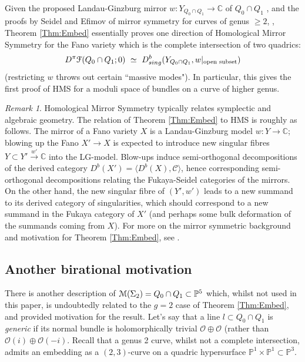 \documentclass[reqno,10pt]{amsart}
\numberwithin{equation}{section}
\newcommand{\bC}{{\mathbb C}}
\newcommand{\bP}{{\mathbb P}}
\newcommand{\scrF}{\EuScript{F}}
\newcommand{\scrM}{\EuScript{M}}
\theoremstyle{remark}
\newtheorem{Remark}[thm]{Remark}
\begin{document}
Given the proposed  Landau-Ginzburg mirror $w:Y_{Q_0 \cap Q_1} \rightarrow \bC$ of  $Q_0 \cap Q_1$ \cite{Katzarkov, Przyj}, and the proofs by Seidel and Efimov of mirror symmetry for curves of genus $\geq 2$,  \cite{Seidel:HMSgenus2, Efimov}, Theorem \ref{Thm:Embed}  essentially proves one direction of Homological Mirror Symmetry for the  Fano variety which is the complete intersection of two quadrics:
\[ D^{\pi}\scrF(Q_0 \cap Q_1;0) \ \simeq \ D^b_{sing}(Y_{Q_0 \cap Q_1},w|_{\text{open subset}}) \]
(restricting $w$ throws out certain ``massive modes").  In particular, this gives the first proof of HMS for a moduli space of bundles on a curve of higher genus.

\begin{Remark}
Homological Mirror Symmetry typically relates symplectic and algebraic geometry.   The relation of Theorem \ref{Thm:Embed} to HMS is roughly as follows. The mirror of a Fano variety $X$ is a Landau-Ginzburg model $w: Y \rightarrow \bC$; blowing up the Fano $X' \rightarrow X$ is expected to introduce new singular fibres $Y \subset Y' \stackrel{w'}{\rightarrow} \bC$ into the LG-model.  Blow-ups induce semi-orthogonal decompositions of the derived category $D^b(X') = \langle D^b(X), \mathcal{C}\rangle$, hence corresponding semi-orthogonal decompositions relating the Fukaya-Seidel categories of the mirrors.  On the other hand, the new singular fibre of $(Y',w')$  leads to a new summand to its derived category of singularities, which should correspond to a new summand in the Fukaya category of  $X'$ (and perhaps some bulk deformation of the summands coming from $X$).   For more on the mirror symmetric background and motivation for Theorem \ref{Thm:Embed}, see \cite{KKOY}.  

\end{Remark}

\subsection{Another birational motivation} \label{Sec:BirModel}
There is another description of $\scrM(\Sigma_2) = Q_0 \cap Q_1 \subset \bP^5$ which, whilst not used in this paper, is undoubtedly related to the $g=2$ case of Theorem \ref{Thm:Embed}, and provided motivation for the result.
 Let's say that a line $l \subset Q_0\cap Q_1$ is \emph{generic} if its normal bundle is holomorphically trivial $\mathcal{O} \oplus \mathcal{O}$ (rather than $\mathcal{O}(i) \oplus \mathcal{O}(-i)$.  Recall that a genus 2 curve, whilst not a complete intersection, admits an embedding as a $(2,3)$-curve on a quadric hypersurface $\bP^1\times \bP^1 \subset \bP^3$.  
\end{document}
